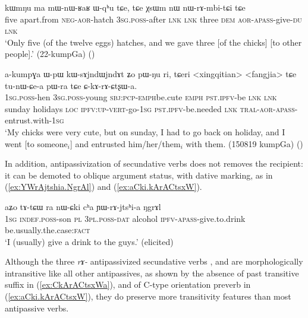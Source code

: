 \begin{exe}
\ex \label{ex:nWrAmbitCi}
\gll   kɯmŋu ma mɯ-nɯ-ʁaʁ ɯ-qʰu tɕe, tɕe χsɯm nɯ nɯ-rɤ-mbi-tɕi tɕe \\
five apart.from \textsc{neg}-\textsc{aor}-hatch \textsc{3sg}.\textsc{poss}-after \textsc{lnk} \textsc{lnk} three \textsc{dem} \textsc{aor}-\textsc{apass}-give-\textsc{du} \textsc{lnk} \\
\glt `Only five (of the twelve eggs) hatches, and we gave three [of the chicks] [to other people].' (22-kumpGa) ()
\end{exe}

\begin{exe}
\ex \label{ex:CkArACtsxWa}
\gll  a-kumpɣa ɯ-pɯ kɯ-sɤjndɯ\redp{}jndɤt ʑo pɯ-ŋu ri, tɕeri <xingqitian> <fangjia> tɕe tu-nɯ-ɕe-a pɯ-ra tɕe ɕ-kɤ-rɤ-ɕtʂɯ-a. \\
\textsc{1sg}.\textsc{poss}-hen \textsc{3sg}.\textsc{poss}-young \textsc{sbj}:\textsc{pcp}-\textsc{emph}\redp{}be.cute \textsc{emph} \textsc{pst}.\textsc{ipfv}-be \textsc{lnk} \textsc{lnk} sunday holidays \textsc{loc} \textsc{ipfv}:\textsc{up}-\textsc{vert}-go-\textsc{1sg} \textsc{pst}.\textsc{ipfv}-be.needed \textsc{lnk} \textsc{tral}-\textsc{aor}-\textsc{apass}-entrust.with-\textsc{1sg} \\
\glt `My chicks were very cute, but on sunday, I had to go back on holiday, and I went [to someone$_i$] and entrusted him/her/them$_i$ with them. (150819 kumpGa)
()
\end{exe}

In addition, antipassivization of secundative verbs does not removes the recipient: it can be demoted to oblique argument status, with dative marking, as in (\ref{ex:YWrAjtshia.NgrAl}) and (\ref{ex:aCki.kArACtsxW}). 
 
\begin{exe}
\ex \label{ex:YWrAjtshia.NgrAl}
\gll  aʑo tɤ-tɕɯ ra nɯ-ɕki cʰa ɲɯ-rɤ-jtsʰi-a ŋgrɤl \\
 \textsc{1sg} \textsc{indef}.\textsc{poss}-son \textsc{pl} \textsc{3pl}.\textsc{poss}-\textsc{dat} alcohol \textsc{ipfv}-\textsc{apass}-give.to.drink be.usually.the.case:\textsc{fact} \\
 \glt `I (usually) give a drink to the guys.' (elicited)
 \end{exe}

Although the three \textit{rɤ-} antipassivized secundative verbs ,  and  are morphologically intransitive like all other antipassives, as shown by the absence of past transitive  suffix in (\ref{ex:CkArACtsxWa}), and of C-type orientation preverb in (\ref{ex:aCki.kArACtsxW}), they do preserve more transitivity features than most antipassive verbs. 

